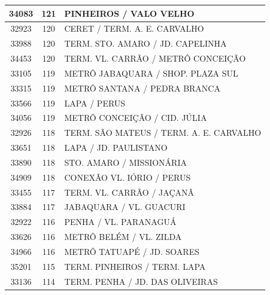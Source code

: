 \documentclass[
	12pt,				%
	oneside,			%
	a4paper,			%
	english,			%
	brazil				%
	]{abntex2ppgsi}
\begin{document}
\begin{apendicesenv}
\begin{longtable}{c|c|p{7cm}}
    34083 & 121   & PINHEIROS / VALO VELHO \\
\hline

    32923 & 120   & CERET / TERM. A. E. CARVALHO \\
\hline

    33988 & 120   & TERM. STO. AMARO / JD. CAPELINHA \\
\hline

    34453 & 120   & TERM. VL. CARRÃO / METRÔ CONCEIÇÃO \\
\hline

    33105 & 119   & METRÔ JABAQUARA / SHOP. PLAZA SUL \\
\hline

    33315 & 119   & METRÔ SANTANA / PEDRA BRANCA \\
\hline

    33566 & 119   & LAPA / PERUS \\
\hline

    34056 & 119   & METRÔ CONCEIÇÃO / CID. JÚLIA \\
\hline

    32926 & 118   & TERM. SÃO MATEUS / TERM. A. E. CARVALHO \\
\hline

    33651 & 118   & LAPA / JD. PAULISTANO \\
\hline

    33890 & 118   & STO. AMARO / MISSIONÁRIA \\
\hline

    34909 & 118   & CONEXÃO VL. IÓRIO / PERUS \\
\hline

    33455 & 117   & TERM. VL. CARRÃO / JAÇANÃ \\
\hline

    33884 & 117   & JABAQUARA / VL. GUACURI \\
\hline

    32922 & 116   & PENHA / VL. PARANAGUÁ \\
\hline

    33626 & 116   & METRÔ BELÉM / VL. ZILDA \\
\hline

    34966 & 116   & METRÔ TATUAPÉ / JD. SOARES \\
\hline

    35201 & 115   & TERM. PINHEIROS / TERM. LAPA \\
\hline

    33136 & 114   & TERM. PENHA / JD. DAS OLIVEIRAS \\
\hline


\end{longtable}
\end{apendicesenv}
\end{document}
